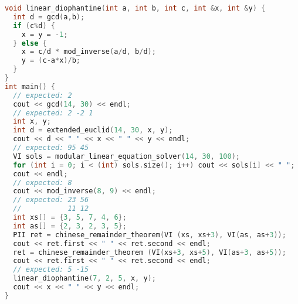 \begin{lstlisting}[language=C++]
void linear_diophantine(int a, int b, int c, int &x, int &y) {
  int d = gcd(a,b);
  if (c%d) {
    x = y = -1;
  } else {
    x = c/d * mod_inverse(a/d, b/d);
    y = (c-a*x)/b;
  }
}
int main() {
  // expected: 2
  cout << gcd(14, 30) << endl;
  // expected: 2 -2 1
  int x, y;
  int d = extended_euclid(14, 30, x, y);
  cout << d << " " << x << " " << y << endl;
  // expected: 95 45
  VI sols = modular_linear_equation_solver(14, 30, 100);
  for (int i = 0; i < (int) sols.size(); i++) cout << sols[i] << " "; 
  cout << endl;
  // expected: 8
  cout << mod_inverse(8, 9) << endl;
  // expected: 23 56
  //           11 12
  int xs[] = {3, 5, 7, 4, 6};
  int as[] = {2, 3, 2, 3, 5};
  PII ret = chinese_remainder_theorem(VI (xs, xs+3), VI(as, as+3));
  cout << ret.first << " " << ret.second << endl;
  ret = chinese_remainder_theorem (VI(xs+3, xs+5), VI(as+3, as+5));
  cout << ret.first << " " << ret.second << endl;
  // expected: 5 -15
  linear_diophantine(7, 2, 5, x, y);
  cout << x << " " << y << endl;
}
\end{lstlisting}
